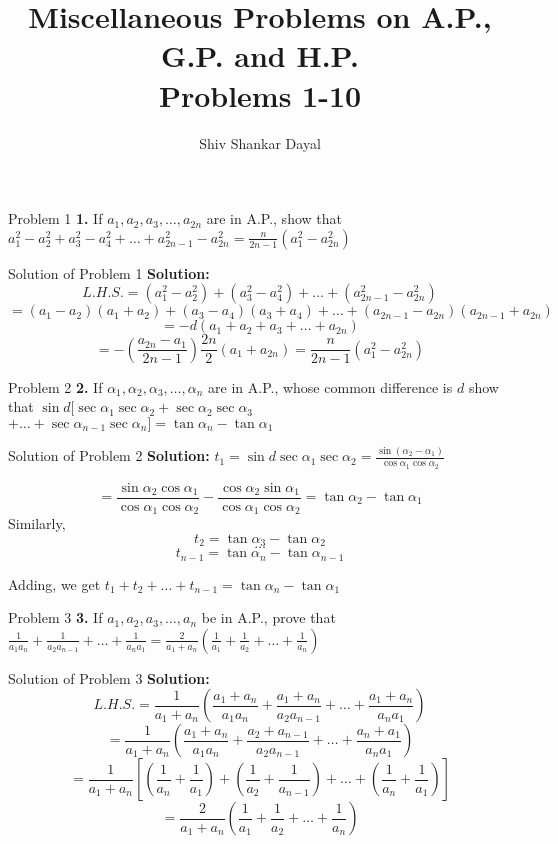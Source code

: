 \documentclass[aspectratio=1610,8pt]{beamer}
\title{Miscellaneous Problems on A.P., G.P. and H.P.\\Problems 1-10}
\author[Shiv Shankar Dayal]{Shiv Shankar Dayal}
\begin{document}
\begin{frame}
  \titlepage
\end{frame}
\begin{frame}{Problem 1}
  \textbf{1.} If $a_1, a_2, a_3, \ldots, a_{2n}$ are in A.P., show that $a_1^2 - a_2^2 + a_3^2 - a_4^2 + \ldots + a_{2n - 1}^2 -
  a_{2n}^2 = \frac{n}{2n - 1}(a_1^2 - a_{2n}^2)$
\end{frame}
\begin{frame}{Solution of Problem 1}
  \textbf{Solution:} $$L.H.S. = (a_1^2 - a_2^2) + (a_3^2 - a_4^2) + \ldots + (a_{2n - 1}^2 - a_{2n}^2)$$
  $$= (a_1 - a_2)(a_1 + a_2) + (a_3 - a_4)(a_3 + a_4) + \ldots + (a_{2n - 1} - a_{2n})(a_{2n - 1} + a_{2n})$$
  $$= -d(a_1 + a_2 + a_3 + \ldots + a_{2n})$$
  $$= -\left(\frac{a_{2n} - a_1}{2n - 1}\right)\frac{2n}{2}(a_1 + a_{2n}) = \frac{n}{2n - 1}(a_1^2 - a_{2n}^2)$$
\end{frame}
\begin{frame}{Problem 2}
  \textbf{2.} If $\alpha_1, \alpha_2, \alpha_3, \ldots, \alpha_n$ are in A.P., whose common difference is $d$ show that $\sin
  d[\sec\alpha_1\sec\alpha_2 + \sec\alpha_2\sec\alpha_3$ $+ \ldots + \sec\alpha_{n - 1}\sec\alpha_n] = \tan\alpha_n - \tan\alpha_1$
\end{frame}
\begin{frame}{Solution of Problem 2}
  \textbf{Solution:} $t_1 = \sin d\sec\alpha_1\sec\alpha_2 = \frac{\sin(\alpha_2 - \alpha_1)}{\cos\alpha_1\cos\alpha_2}$

  $$=\frac{\sin\alpha_2\cos\alpha_1}{\cos\alpha_1\cos\alpha_2} - \frac{\cos\alpha_2\sin\alpha_1}{\cos\alpha_1\cos\alpha_2} =
  \tan\alpha_2 - \tan\alpha_1$$
  Similarly, $$t_2 = \tan\alpha_3 - \tan\alpha_2$$
  $$\ldots$$
  $$t_{n - 1} = \tan\alpha_n - \tan\alpha_{n - 1}$$

  Adding, we get $t_1 + t_2 + \ldots + t_{n - 1} = \tan\alpha_n - \tan\alpha_1$
\end{frame}
\begin{frame}{Problem 3}
  \textbf{3.} If $a_1, a_2, a_3, \ldots, a_n$ be in A.P., prove that $\frac{1}{a_1a_n} + \frac{1}{a_2a_{n - 1}} + \ldots +
  \frac{1}{a_na_1} = \frac{2}{a_1 + a_n}\left(\frac{1}{a_1} + \frac{1}{a_2} + \ldots + \frac{1}{a_n}\right)$
\end{frame}
\begin{frame}{Solution of Problem 3}
  \textbf{Solution:}$$L.H.S. = \frac{1}{a_1 + a_n}\left(\frac{a_1 + a_n}{a_1a_n} + \frac{a_1 + a_n}{a_2a_{n - 1}} + \ldots +
  \frac{a_1 + a_n}{a_na_1}\right)$$
  $$= \frac{1}{a_1 + a_n}\left(\frac{a_1 + a_n}{a_1a_n} + \frac{a_2 + a_{n - 1}}{a_2a_{n - 1}} + \ldots + \frac{a_n +
    a_1}{a_na_1}\right)$$
  $$= \frac{1}{a_1 + a_n}\left[\left(\frac{1}{a_n} + \frac{1}{a_1}\right) + \left(\frac{1}{a_2} + \frac{1}{a_{n - 1}}\right) +
    \ldots + \left(\frac{1}{a_n} + \frac{1}{a_1}\right)\right]$$
  $$= \frac{2}{a_1 + a_n}\left(\frac{1}{a_1} + \frac{1}{a_2} + \ldots + \frac{1}{a_n}\right)$$
\end{frame}
\end{document}
